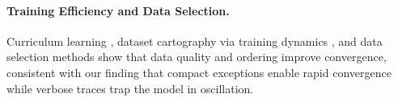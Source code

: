 \paragraph{Training Efficiency and Data Selection.}
Curriculum learning \citep{bengio2009curriculum}, dataset cartography via training dynamics \citep{swayamdipta2020cartography}, and data selection methods \citep{sachdeva2024dataefficient,xie2023doremi} show that data quality and ordering improve convergence, consistent with our finding that compact exceptions enable rapid convergence while verbose traces trap the model in oscillation.
